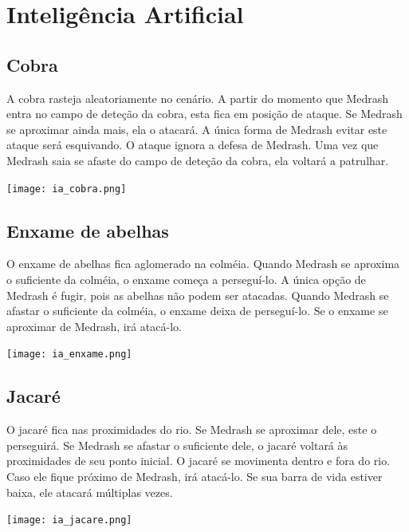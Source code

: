 \section{Inteligência Artificial}

\subsection{Cobra}

A cobra rasteja aleatoriamente no cenário. A partir do momento que
Medrash entra no campo de deteção da cobra, esta fica em posição
de ataque. Se Medrash se aproximar ainda mais, ela o atacará.
A única forma de Medrash evitar este ataque será esquivando. O ataque
ignora a defesa de Medrash.
Uma vez que Medrash saia se afaste do campo de deteção da cobra, ela
voltará a patrulhar.

\begin{center}
 \texttt{[image: ia\_cobra.png]}
\end{center}

\subsection{Enxame de abelhas}

O enxame de abelhas fica aglomerado na colméia. Quando Medrash se
aproxima o suficiente da colméia, o enxame começa a perseguí-lo.
A única opção de Medrash é fugir, pois as abelhas não podem ser atacadas.
Quando Medrash se afastar o suficiente da colméia, o enxame deixa
de perseguí-lo.
Se o enxame se aproximar de Medrash, irá atacá-lo.

\begin{center}
 \texttt{[image: ia\_enxame.png]}
\end{center}

\subsection{Jacaré}

O jacaré fica nas proximidades do rio. Se Medrash se aproximar dele,
este o perseguirá. Se Medrash se afastar o suficiente dele, o jacaré voltará às proximidades de seu ponto inicial.
O jacaré se movimenta dentro e fora do rio. Caso ele fique próximo de
Medrash, irá atacá-lo. Se sua barra de vida estiver baixa, ele atacará
múltiplas vezes.

\begin{center}
 \texttt{[image: ia\_jacare.png]}
\end{center}

